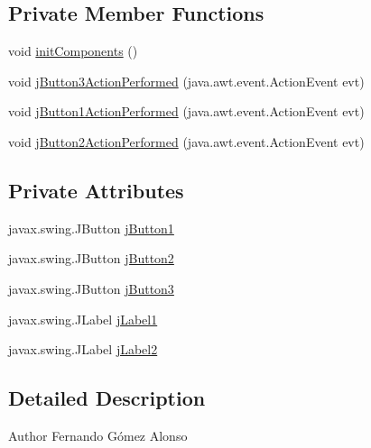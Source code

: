 \subsection*{Private Member Functions}
\begin{DoxyCompactItemize}
\item 
void \mbox{\hyperlink{class_interfaz_package_1_1_interfaz_comprar_a92f8253864e17e07ed47fffaefb88668}{init\+Components}} ()
\item 
void \mbox{\hyperlink{class_interfaz_package_1_1_interfaz_comprar_a4cbb42295fa843c3ba653fbe9a43ab1e}{j\+Button3\+Action\+Performed}} (java.\+awt.\+event.\+Action\+Event evt)
\item 
void \mbox{\hyperlink{class_interfaz_package_1_1_interfaz_comprar_aedd6af08b9d86de535615bdf8e6d63ae}{j\+Button1\+Action\+Performed}} (java.\+awt.\+event.\+Action\+Event evt)
\item 
void \mbox{\hyperlink{class_interfaz_package_1_1_interfaz_comprar_addcea73314639a2e954a8993777bc6c6}{j\+Button2\+Action\+Performed}} (java.\+awt.\+event.\+Action\+Event evt)
\end{DoxyCompactItemize}
\subsection*{Private Attributes}
\begin{DoxyCompactItemize}
\item 
javax.\+swing.\+J\+Button \mbox{\hyperlink{class_interfaz_package_1_1_interfaz_comprar_ab2d3c9abb855370537718c51d54c4a83}{j\+Button1}}
\item 
javax.\+swing.\+J\+Button \mbox{\hyperlink{class_interfaz_package_1_1_interfaz_comprar_a60c822302c1ba43e1ab6a812bfc0881b}{j\+Button2}}
\item 
javax.\+swing.\+J\+Button \mbox{\hyperlink{class_interfaz_package_1_1_interfaz_comprar_addad0d7464d6b4d8ce1a868d0b289a13}{j\+Button3}}
\item 
javax.\+swing.\+J\+Label \mbox{\hyperlink{class_interfaz_package_1_1_interfaz_comprar_a59aeb61174932ff58c3f19f7e92450df}{j\+Label1}}
\item 
javax.\+swing.\+J\+Label \mbox{\hyperlink{class_interfaz_package_1_1_interfaz_comprar_a3ae8bac05864b4e4109e88784240a350}{j\+Label2}}
\end{DoxyCompactItemize}


\subsection{Detailed Description}
\begin{DoxyAuthor}{Author}
Fernando Gómez Alonso 
\end{DoxyAuthor}


